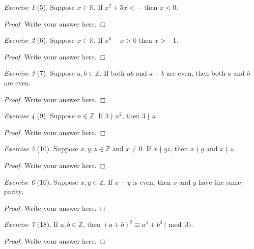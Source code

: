\documentclass[12pt]{amsart}
\theoremstyle{remark}
\newtheorem*{exercise}{Exercise}%
\def\RR{\ensuremath{\mathbb R}}
\def\ZZ{\ensuremath{\mathbb Z}}
\theoremstyle{mycomment}
\begin{document}
\begin{exercise}[5] Suppose $x\in\RR$. %
If $x^{2}+5x<-$ then $x<0$.
\begin{proof}
Write your answer here.
\end{proof}
\end{exercise}

\begin{exercise}[6] Suppose $x\in\RR$. If $x^{3}-x>0$ then $x>-1$.
\begin{proof}
Write your answer here.
\end{proof}
\end{exercise}

\begin{exercise}[7] Suppose $a,b\in\ZZ$. If both $ab$ and $a+b$ are even, then both $a$ and $b$ are even.
\begin{proof}
Write your answer here.
\end{proof}
\end{exercise}

\begin{exercise}[9] Suppose $n\in\ZZ$. If $3\nmid n^{2}$, then $3\nmid n$. %
\begin{proof}
Write your answer here.
\end{proof}
\end{exercise}

\begin{exercise}[10] Suppose $x,y,z\in\ZZ$ and $x\ne 0$. %
If $x\nmid yz$, then $x\nmid y$ and $x\nmid z$.
\begin{proof}
Write your answer here.
\end{proof}
\end{exercise}

\begin{exercise}[16] Suppose $x,y\in\ZZ$. If $x+y$ is even, then $x$ and $y$ have the same parity.
\begin{proof}
Write your answer here.
\end{proof}
\end{exercise}

\begin{exercise}[18] If $a,b\in\ZZ$, then $(a+b)^{3}\equiv a^{3}+b^{3}\pmod 3$. %
\begin{proof}
Write your answer here.
\end{proof}
\end{exercise}
\end{document}
